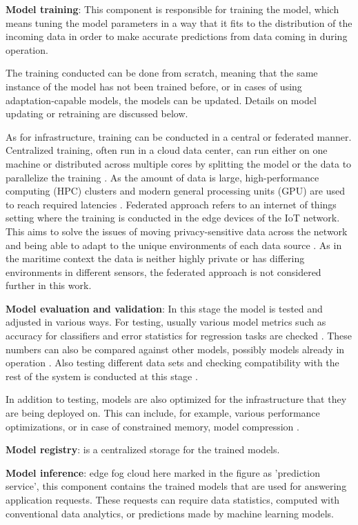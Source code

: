 \textbf{Model training}: This component is responsible for training the model, which means tuning the model parameters in a way that it fits to the distribution of the incoming data in order to make accurate predictions from data coming in during operation.

The training conducted can be done from scratch, meaning that the same instance of the model has not been trained before, or in cases of using adaptation-capable models, the models can be updated. Details on model updating or retraining are discussed below.

As for infrastructure, training can be conducted in a central or federated manner. Centralized training, often run in a cloud data center, can run either on one machine or distributed across multiple cores by splitting the model or the data to parallelize the training \cite{iotsurvey}. As the amount of data is large, high-performance computing (HPC) clusters and modern general processing units (GPU) are used to reach required latencies \cite{iotsurvey}. Federated approach refers to an internet of things setting where the training is conducted in the edge devices of the IoT network. This aims to solve the issues of moving privacy-sensitive data across the network and being able to adapt to the unique environments of each data source \cite{iotsurvey}. As in the maritime context the data is neither highly private or has differing environments in different sensors, the federated approach is not considered further in this work.

\textbf{Model evaluation and validation}: In this stage the model is tested and adjusted in various ways. For testing, usually various model metrics such as accuracy for classifiers and error statistics for regression tasks are checked \cite{iotsurvey}. These numbers can also be compared against other models, possibly models already in operation \cite{googlemlops}. Also testing different data sets and checking compatibility with the rest of the system is conducted at this stage \cite{googlemlops}.

In addition to testing, models are also optimized for the infrastructure that they are being deployed on. This can include, for example, various performance optimizations, or in case of constrained memory, model compression \cite{iotsurvey}.

\textbf{Model registry}: is a centralized storage for the trained models. 


\textbf{Model inference}: edge fog cloud here marked in the figure as 'prediction service', this component contains the trained models that are used for answering application requests. These requests can require data statistics, computed with conventional data analytics, or predictions made by machine learning models.

